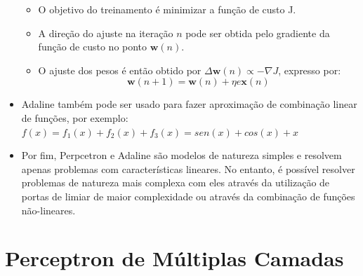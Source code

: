 \documentclass{article}
\begin{document}
\begin{itemize}
\begin{itemize}
			\item O objetivo do treinamento é minimizar a função de custo J.
			\item A direção do ajuste na iteração $n$ pode ser obtida pelo gradiente da função de custo no ponto $\mathbf{w}(n)$.
			\item O ajuste dos pesos é então obtido por $\Delta \mathbf{w}(n) \propto - \nabla J$, expresso por:
			$$ \mathbf{w}(n+1) = \mathbf{w}(n)+\eta e \mathbf{x}(n) $$
		\end{itemize}
		\item Adaline também pode ser usado para fazer aproximação de combinação linear de funções, por exemplo: $f(x) = f_1(x) + f_2(x) + f_3(x) = sen(x) + cos(x) + x$
		\item Por fim, Perpcetron e Adaline são modelos de natureza simples e resolvem apenas problemas com características lineares. No entanto, é possível resolver problemas de natureza mais complexa com eles através da utilização de portas de limiar de maior complexidade ou através da combinação de funções não-lineares.
	\end{itemize}

\section{Perceptron de Múltiplas Camadas}
\end{document}
